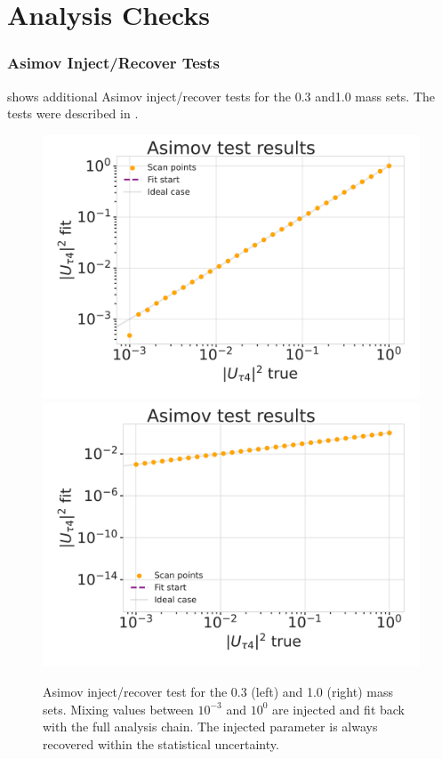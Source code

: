 
\chapter{Analysis Checks}

\subsection{Asimov Inject/Recover Tests} 

 shows additional Asimov inject/recover tests for the \SI{0.3}{\gev} and\SI{1.0}{\gev} mass sets. The tests were described in .

\begin{figure}[h]
    \includegraphics[width=0.49\linewidth]{figures/results/checks/asimov_scan_0.3_GeV-01.png}
    \includegraphics[width=0.49\linewidth]{figures/results/checks/asimov_scan_1.0_GeV-01.png}
	\caption[Asimov inject/recover test (\SI{0.3}{\gev}, \SI{1.0}{\gev})]{Asimov inject/recover test for the \SI{0.3}{\gev} (left) and \SI{1.0}{\gev} (right) mass sets. Mixing values between $10^{-3}$ and $10^{0}$ are injected and fit back with the full analysis chain. The injected parameter is always recovered within the statistical uncertainty.}
\end{figure}
